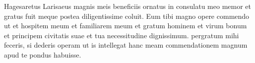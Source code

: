 


Hagesaretus Larisaeus magnis meis beneficiis ornatus in consulatu meo memor et gratus fuit meque postea diligentissime coluit.  Eum tibi magno opere commendo ut et hospitem meum et familiarem meum et gratum hominem et virum bonum et principem civitatis suae et tua necessitudine dignissimum. pergratum mihi feceris, si dederis operam ut is intellegat hanc meam commendationem magnum apud te pondus habuisse.
